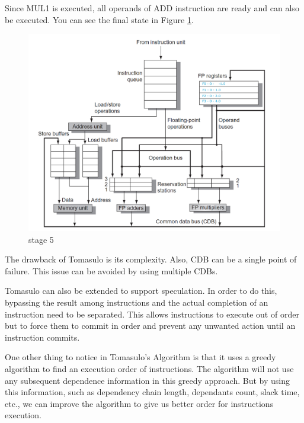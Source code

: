 \documentclass[12pt]{article}
\begin{document}
Since MUL1 is executed, all operands of ADD instruction are ready and can also be executed. You can see the final state in Figure \ref{fig:tom6}.

\begin{figure}[H]
	\centering
	\includegraphics[width=1\textwidth]{./images/tomas/e5.png}	
	\cprotect\caption{stage 5}
	\label{fig:tom6}
\end{figure}


The drawback of Tomasulo is its complexity. Also, CDB can be a single point of failure. This issue can be avoided by using multiple CDBs.

Tomasulo can also be extended to support speculation. In order to do this, bypassing the result among instructions and the actual completion of an instruction need to be separated. This allows instructions to execute
out of order but to force them to commit in order and prevent any unwanted action until an instruction commits.

One other thing to notice in Tomasulo's Algorithm is that it uses a greedy algorithm to find an execution order of instructions.
The algorithm will not use any subsequent dependence information in this greedy approach. But by using this information, such as dependency chain length, dependants count, slack time, etc., we can improve the algorithm to give us better order for instructions execution.

\nocite{*}





\end{document}
